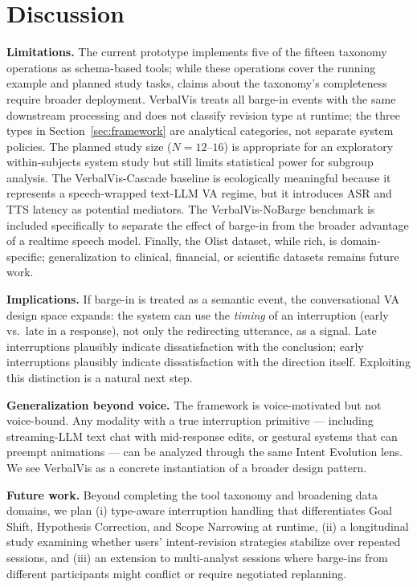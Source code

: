\documentclass[journal]{IEEEtran}
\begin{document}
\section{Discussion}
\label{sec:discussion}

\textbf{Limitations.} The current prototype implements five of the fifteen taxonomy operations as schema-based tools; while these operations cover the running example and planned study tasks, claims about the taxonomy's completeness require broader deployment. VerbalVis treats all barge-in events with the same downstream processing and does not classify revision type at runtime; the three types in Section~\ref{sec:framework} are analytical categories, not separate system policies. The planned study size ($N{=}12$--$16$) is appropriate for an exploratory within-subjects system study but still limits statistical power for subgroup analysis. The VerbalVis-Cascade baseline is ecologically meaningful because it represents a speech-wrapped text-LLM VA regime, but it introduces ASR and TTS latency as potential mediators. The VerbalVis-NoBarge benchmark is included specifically to separate the effect of barge-in from the broader advantage of a realtime speech model. Finally, the Olist dataset, while rich, is domain-specific; generalization to clinical, financial, or scientific datasets remains future work.

\textbf{Implications.} If barge-in is treated as a semantic event, the conversational VA design space expands: the system can use the \emph{timing} of an interruption (early vs.\ late in a response), not only the redirecting utterance, as a signal. Late interruptions plausibly indicate dissatisfaction with the conclusion; early interruptions plausibly indicate dissatisfaction with the direction itself. Exploiting this distinction is a natural next step.

\textbf{Generalization beyond voice.} The framework is voice-motivated but not voice-bound. Any modality with a true interruption primitive --- including streaming-LLM text chat with mid-response edits, or gestural systems that can preempt animations --- can be analyzed through the same Intent Evolution lens. We see VerbalVis as a concrete instantiation of a broader design pattern.

\textbf{Future work.} Beyond completing the tool taxonomy and broadening data domains, we plan (i) type-aware interruption handling that differentiates Goal Shift, Hypothesis Correction, and Scope Narrowing at runtime, (ii) a longitudinal study examining whether users' intent-revision strategies stabilize over repeated sessions, and (iii) an extension to multi-analyst sessions where barge-ins from different participants might conflict or require negotiated replanning.
\end{document}
